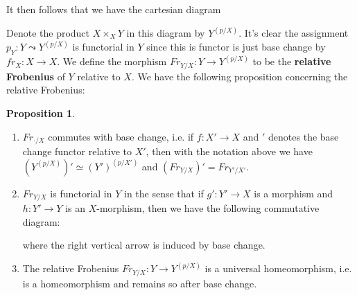 \documentclass{ucbthesis}
\theoremstyle{definition}
\theoremstyle{theorem}
\newtheorem{prop}[thm]{Proposition}
\begin{document}
It then follows that we have the cartesian diagram
\begin{center}
\end{center}

Denote the product $X\times_{X} Y$ in this diagram by $Y^{(p/X)}$. It's clear the assignment $p_{Y}:Y \leadsto Y^{(p/X)}$ is functorial in $Y$ since this is functor is just base change by $fr_{X}:X\rightarrow X$. We define the morphism $Fr_{Y/X}:Y \rightarrow Y^{(p/X)}$ to be the \textbf{relative Frobenius} of $Y$ relative to $X$. We have the following proposition concerning the relative Frobenius:

\begin{prop}
\begin{enumerate}
  \item $Fr_{\cdot/X}$ commutes with base change, i.e. if $f:X'\rightarrow X$ and $'$ denotes the base
   change functor relative to $X'$, then with the notation above we have $(Y^{(p/X)})'\simeq (Y')^{(p/X')}$ and $(Fr_{Y/X})' = Fr_{Y'/X'}$.
  \item $Fr_{Y/X}$ is functorial in $Y$ in the sense that if $g':Y'\rightarrow X$ is a morphism and $h:Y'\rightarrow Y$ is an $X$-morphism, then we have the following commutative diagram:
\begin{center}
\end{center}
where the right vertical arrow is induced by base change. 
  \item The relative Frobenius $Fr_{Y/X}:Y\rightarrow Y^{(p/X)}$ is a universal homeomorphism, i.e. is a homeomorphism and remains so after base change. 
\end{enumerate}
\end{prop}
\end{document}
